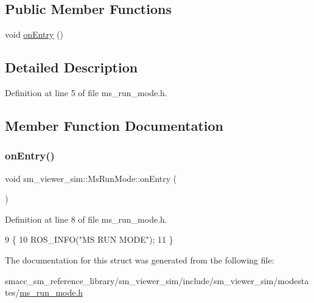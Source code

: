 \subsection*{Public Member Functions}
\begin{DoxyCompactItemize}
\item 
void \hyperlink{structsm__viewer__sim_1_1MsRunMode_a25bd4307e205cf5aae761750efc71905}{on\+Entry} ()
\end{DoxyCompactItemize}


\subsection{Detailed Description}


Definition at line 5 of file ms\+\_\+run\+\_\+mode.\+h.



\subsection{Member Function Documentation}
\mbox{\label{structsm__viewer__sim_1_1MsRunMode_a25bd4307e205cf5aae761750efc71905}} 
\subsubsection{\texorpdfstring{on\+Entry()}{onEntry()}}
{\footnotesize\ttfamily void sm\+\_\+viewer\+\_\+sim\+::\+Ms\+Run\+Mode\+::on\+Entry (\begin{DoxyParamCaption}{ }\end{DoxyParamCaption})\hspace{0.3cm}{\ttfamily [inline]}}



Definition at line 8 of file ms\+\_\+run\+\_\+mode.\+h.


\begin{DoxyCode}
9     \{
10         ROS\_INFO(\textcolor{stringliteral}{"MS RUN MODE"});
11     \}
\end{DoxyCode}


The documentation for this struct was generated from the following file\+:\begin{DoxyCompactItemize}
\item 
smacc\+\_\+sm\+\_\+reference\+\_\+library/sm\+\_\+viewer\+\_\+sim/include/sm\+\_\+viewer\+\_\+sim/modestates/\hyperlink{ms__run__mode_8h}{ms\+\_\+run\+\_\+mode.\+h}\end{DoxyCompactItemize}
